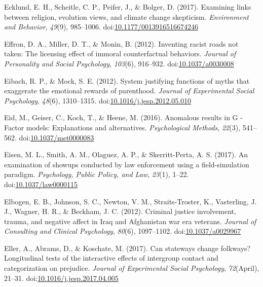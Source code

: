 \documentclass[english,man]{apa6}
\begin{document}
\hypertarget{ref-Ecklund2017}{}
Ecklund, E. H., Scheitle, C. P., Peifer, J., \& Bolger, D. (2017).
Examining links between religion, evolution views, and climate change
skepticism. \emph{Environment and Behavior}, \emph{49}(9), 985--1006.
doi:\href{https://doi.org/10.1177/0013916516674246}{10.1177/0013916516674246}

\hypertarget{ref-Effron2012}{}
Effron, D. A., Miller, D. T., \& Monin, B. (2012). Inventing racist
roads not taken: The licensing effect of immoral counterfactual
behaviors. \emph{Journal of Personality and Social Psychology},
\emph{103}(6), 916--932.
doi:\href{https://doi.org/10.1037/a0030008}{10.1037/a0030008}

\hypertarget{ref-Eibach2012}{}
Eibach, R. P., \& Mock, S. E. (2012). System justifying functions of
myths that exaggerate the emotional rewards of parenthood. \emph{Journal
of Experimental Social Psychology}, \emph{48}(6), 1310--1315.
doi:\href{https://doi.org/10.1016/j.jesp.2012.05.010}{10.1016/j.jesp.2012.05.010}

\hypertarget{ref-Eid2016}{}
Eid, M., Geiser, C., Koch, T., \& Heene, M. (2016). Anomalous results in
G -Factor models: Explanations and alternatives. \emph{Psychological
Methods}, \emph{22}(3), 541--562.
doi:\href{https://doi.org/10.1037/met0000083}{10.1037/met0000083}

\hypertarget{ref-Eisen2017}{}
Eisen, M. L., Smith, A. M., Olaguez, A. P., \& Skerritt-Perta, A. S.
(2017). An examination of showups conducted by law enforcement using a
field-simulation paradigm. \emph{Psychology, Public Policy, and Law},
\emph{23}(1), 1--22.
doi:\href{https://doi.org/10.1037/law0000115}{10.1037/law0000115}

\hypertarget{ref-Elbogen2012}{}
Elbogen, E. B., Johnson, S. C., Newton, V. M., Straits-Troster, K.,
Vasterling, J. J., Wagner, H. R., \& Beckham, J. C. (2012). Criminal
justice involvement, trauma, and negative affect in Iraq and Afghanistan
war era veterans. \emph{Journal of Consulting and Clinical Psychology},
\emph{80}(6), 1097--1102.
doi:\href{https://doi.org/10.1037/a0029967}{10.1037/a0029967}

\hypertarget{ref-Eller2017}{}
Eller, A., Abrams, D., \& Koschate, M. (2017). Can stateways change
folkways? Longitudinal tests of the interactive effects of intergroup
contact and categorization on prejudice. \emph{Journal of Experimental
Social Psychology}, \emph{72}(April), 21--31.
doi:\href{https://doi.org/10.1016/j.jesp.2017.04.005}{10.1016/j.jesp.2017.04.005}
\end{document}
